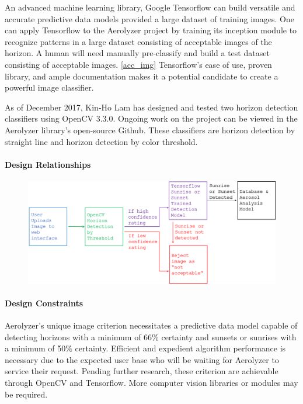 \documentclass[onecolumn, draftclsnofoot,10pt, compsoc]{IEEEtran}
\begin{document}
\begin{singlespace}
				An advanced machine learning library, Google Tensorflow can build versatile and accurate predictive data models provided a large dataset of training images. One can apply Tensorflow to the Aerolyzer project by training its inception module to recognize patterns in a large dataset consisting of acceptable images of the horizon. A human will need manually pre-classify and build a test dataset consisting of acceptable images. \ref{acc_img}  Tensorflow’s ease of use, proven library, and ample documentation makes it a potential candidate to create a powerful image classifier. \cite{rhnvrm} \cite{RNN}

				As of December 2017, Kin-Ho Lam has designed and tested two horizon detection classifiers using OpenCV 3.3.0. Ongoing work on the project can be viewed in the Aerolyzer library’s open-source Github. These classifiers are horizon detection by straight line and horizon detection by color threshold.

          \paragraph{Design Relationships}
		        \begin{figure}[h]
					\centering
					\includegraphics[width=4.5in,natwidth=1907,natheight=787]{images/tensor.png}
				\end{figure}
          \paragraph{Design Constraints}
          		Aerolyzer’s unique image criterion necessitates a predictive data model capable of detecting horizons with a minimum of 66\% certainty and sunsets or sunrises with a minimum of 50\% certainty. Efficient and expedient algorithm performance is necessary due to the expected user base who will be waiting for Aerolyzer to service their request. Pending further research, these criterion are achievable through OpenCV and Tensorflow. More computer vision libraries or modules may be required.
      

\end{singlespace}
\end{document}

